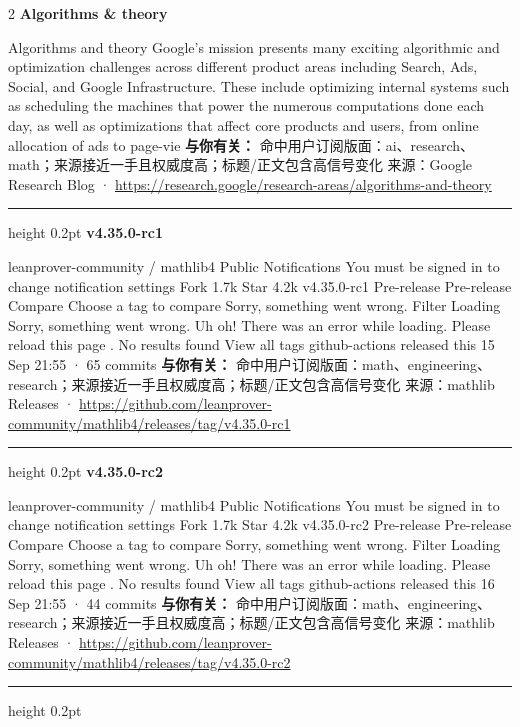 \documentclass[10.5pt]{ctexart}
\begin{document}
\begin{multicols}{2}
{\large\bfseries Algorithms \& theory}\par
Algorithms and theory Google’s mission presents many exciting algorithmic and optimization challenges across different product areas including Search, Ads, Social, and Google Infrastructure. These include optimizing internal systems such as scheduling the machines that power the numerous computations done each day, as well as optimizations that affect core products and users, from online allocation of ads to page-vie
\textbf{与你有关：} 命中用户订阅版面：ai、research、math；来源接近一手且权威度高；标题/正文包含高信号变化
{\footnotesize\color{ormuted} 来源：Google Research Blog · \url{https://research.google/research-areas/algorithms-and-theory}}
\vspace{2mm}
\hrule height 0.2pt
\vspace{2mm}
{\large\bfseries v4.35.0-rc1}\par
leanprover-community / mathlib4 Public Notifications You must be signed in to change notification settings Fork 1.7k Star 4.2k v4.35.0-rc1 Pre-release Pre-release Compare Choose a tag to compare Sorry, something went wrong. Filter Loading Sorry, something went wrong. Uh oh! There was an error while loading. Please reload this page . No results found View all tags github-actions released this 15 Sep 21:55 · 65 commits
\textbf{与你有关：} 命中用户订阅版面：math、engineering、research；来源接近一手且权威度高；标题/正文包含高信号变化
{\footnotesize\color{ormuted} 来源：mathlib Releases · \url{https://github.com/leanprover-community/mathlib4/releases/tag/v4.35.0-rc1}}
\vspace{2mm}
\hrule height 0.2pt
\vspace{2mm}
{\large\bfseries v4.35.0-rc2}\par
leanprover-community / mathlib4 Public Notifications You must be signed in to change notification settings Fork 1.7k Star 4.2k v4.35.0-rc2 Pre-release Pre-release Compare Choose a tag to compare Sorry, something went wrong. Filter Loading Sorry, something went wrong. Uh oh! There was an error while loading. Please reload this page . No results found View all tags github-actions released this 16 Sep 21:55 · 44 commits
\textbf{与你有关：} 命中用户订阅版面：math、engineering、research；来源接近一手且权威度高；标题/正文包含高信号变化
{\footnotesize\color{ormuted} 来源：mathlib Releases · \url{https://github.com/leanprover-community/mathlib4/releases/tag/v4.35.0-rc2}}
\vspace{2mm}
\hrule height 0.2pt

\end{multicols}
\end{document}

